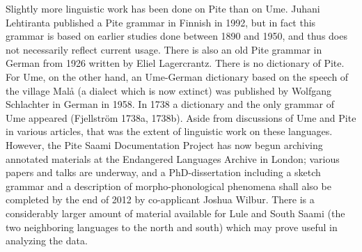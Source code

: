 \documentclass[a4paper,12pt]{article}
\begin{document}

Slightly more linguistic work has been done on Pite than on Ume. Juhani Lehtiranta published a Pite grammar in Finnish in 1992, but in fact this grammar is based on earlier studies done between 1890 and 1950, and thus does not necessarily reflect current usage. There is also an old Pite grammar in German from 1926 written by Eliel Lagercrantz. There is no dictionary of Pite. For Ume, on the other hand, an Ume-German dictionary based on the speech of the village Malå (a dialect which is now extinct) was published by Wolfgang Schlachter in German in 1958. In 1738 a dictionary and the only grammar of Ume appeared (Fjellström 1738a, 1738b). Aside from discussions of Ume and Pite in various articles, that was the extent of linguistic work on these languages. However, the Pite Saami Documentation Project has now begun archiving annotated materials at the Endangered Languages Archive in London; %
various papers and talks are underway, %
and a PhD-dissertation including a sketch grammar and a description of morpho-phonological phenomena shall also be completed by the end of 2012 by co-applicant Joshua Wilbur. There is a considerably larger amount of material available for Lule and South Saami (the two neighboring languages to the north and south) which may prove useful in analyzing the data.
\end{document}

